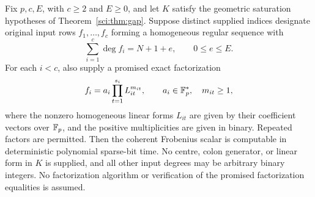 \begin{theorem}
\label{sci:thm:factored-prefix}
Fix \(p,c,E\), with \(c\geq2\) and \(E\geq0\), and let \(K\)
satisfy the geometric saturation hypotheses of
Theorem~\ref{sci:thm:gap}. Suppose distinct supplied indices designate
original input rows \(f_1,\ldots,f_c\) forming a homogeneous regular
sequence with
\[
 \sum_{i=1}^c\deg f_i=N+1+e,\qquad 0\leq e\leq E.
\]
For each \(i<c\), also supply a promised exact factorization
\[
 f_i=a_i\prod_{t=1}^{s_i}L_{it}^{m_{it}},
 \qquad a_i\in\mathbb F_p^*,\quad m_{it}\geq1,
\]
where the nonzero homogeneous linear forms \(L_{it}\) are given by
their coefficient vectors over \(\mathbb F_p\), and the positive multiplicities
are given in binary. Repeated factors are permitted. Then the coherent
Frobenius scalar is computable in deterministic polynomial sparse-bit
time. No centre, colon generator, or linear form in \(K\) is supplied,
and all other input degrees may be arbitrary binary integers.
No factorization algorithm or verification of the promised factorization
equalities is assumed.
\end{theorem}
